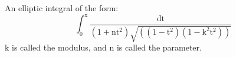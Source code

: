 An elliptic integral of the form:
\[ \int _{0} ^{\mathrm{x}}
\frac{\mathrm{dt}}
{(1+ \mathrm{nt}^2 ) \sqrt{ (( 1 - \mathrm{t}^2 ) ( 1 - \mathrm{k}^2 \mathrm{t}^2 )) } }
\] 
k is called the modulus, and n is called the parameter.